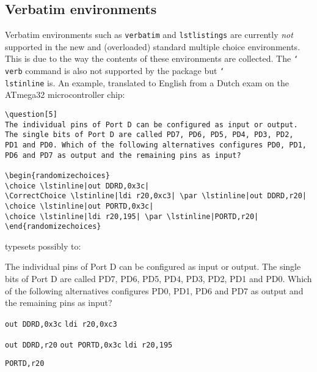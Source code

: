 \documentclass[12pt,a4paper]{exam}
\providecommand{\texorpdfstring}[2]{#1}
\newcommand{\bs}{\texorpdfstring{\char`\\}{}}
\begin{document}
\subsection{Verbatim environments}
Verbatim environments such as \texttt{verbatim} and \texttt{lstlistings}
are currently \emph{not} supported in the new and (overloaded) standard multiple
choice environments. This is due to the way the contents of these environments
are collected. The \texttt{\bs verb} command is also not supported by the package
but \texttt{\bs lstinline} is. An example, translated to English from a Dutch exam
on the ATmega32 microcontroller chip:

\begin{lstlisting}
\question[5]
The individual pins of Port D can be configured as input or output.
The single bits of Port D are called PD7, PD6, PD5, PD4, PD3, PD2,
PD1 and PD0. Which of the following alternatives configures PD0, PD1,
PD6 and PD7 as output and the remaining pins as input?

\begin{randomizechoices}
\choice \lstinline|out DDRD,0x3c|
\CorrectChoice \lstinline|ldi r20,0xc3| \par \lstinline|out DDRD,r20|
\choice \lstinline|out PORTD,0x3c|
\choice \lstinline|ldi r20,195| \par \lstinline|PORTD,r20|
\end{randomizechoices}
\end{lstlisting}

typesets possibly to:

\begin{questions}
\setlength{\parskip}{0pt}
\setcounter{question}{8}
\question[5]
The individual pins of Port D can be configured as input or output. The single bits
of Port D are called PD7, PD6, PD5, PD4, PD3, PD2, PD1 and PD0. Which of the
following alternatives configures PD0, PD1, PD6 and PD7 as output and the remaining
pins as input?


\hspace*{\baselineskip}

\begin{randomizechoices}[norandomize]
	\choice \lstinline|out DDRD,0x3c|
	\CorrectChoice \lstinline|ldi r20,0xc3| \par \lstinline|out DDRD,r20|
    \choice \lstinline|out PORTD,0x3c|
	\choice \lstinline|ldi r20,195| \par \lstinline|PORTD,r20|
\end{randomizechoices}
\end{questions}
\end{document}
